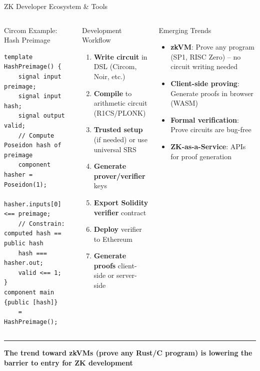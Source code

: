 \documentclass[8pt,aspectratio=169]{beamer}
\newcommand{\bottomnote}[1]{\vfill\vspace{-2mm}\textcolor{mllavender2}{\rule{\textwidth}{0.4pt}}\vspace{1mm}\footnotesize\textbf{#1}}
\begin{document}
\begin{frame}[fragile]{ZK Developer Ecosystem \& Tools}
\begin{columns}[T]
\begin{block}{\footnotesize Circom Example: Hash Preimage}
\begin{lstlisting}[basicstyle=\fontsize{4.5pt}{5.5pt}\ttfamily,
  morekeywords={pragma,circom,template,signal,input,output,component,main}]
template HashPreimage() {
    signal input preimage;
    signal input hash;
    signal output valid;
    // Compute Poseidon hash of preimage
    component hasher = Poseidon(1);
    hasher.inputs[0] <== preimage;
    // Constrain: computed hash == public hash
    hash === hasher.out;
    valid <== 1;
}
component main {public [hash]}
    = HashPreimage();
\end{lstlisting}
\end{block}
\begin{block}{\footnotesize Development Workflow}
\footnotesize
\begin{enumerate}
\item \textbf{Write circuit} in DSL (Circom, Noir, etc.)
\item \textbf{Compile} to arithmetic circuit (R1CS/PLONK)
\item \textbf{Trusted setup} (if needed) or use universal SRS
\item \textbf{Generate prover/verifier} keys
\item \textbf{Export Solidity verifier} contract
\item \textbf{Deploy} verifier to Ethereum
\item \textbf{Generate proofs} client-side or server-side
\end{enumerate}
\end{block}
\vspace{0.1cm}
\begin{exampleblock}{\footnotesize Emerging Trends}
\footnotesize
\begin{itemize}
\item \textbf{zkVM}: Prove any program (SP1, RISC Zero) -- no circuit writing needed
\item \textbf{Client-side proving}: Generate proofs in browser (WASM)
\item \textbf{Formal verification}: Prove circuits are bug-free
\item \textbf{ZK-as-a-Service}: APIs for proof generation
\end{itemize}
\end{exampleblock}
\end{columns}
\bottomnote{The trend toward zkVMs (prove any Rust/C program) is lowering the barrier to entry for ZK development}
\end{frame}
\end{document}
